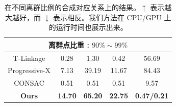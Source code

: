 \begin{table}[ht]
{\begin{tabular}{ccccc}
            \hline
            \multicolumn{5}{c}{离群点比重 : $90\%\sim99\%$} \\
            \hline
            T-Linkage & 0.28 & 1.30 & 0.42 & 56.69 \\
            Progressive-X & 7.13 & 39.19 & 11.67 & 84.43\\
            CONSAC & 0.51 & 0.51 & 0.51 & 9.57  \\
            \textbf{Ours} & \textbf{14.70} & \textbf{65.20} & \textbf{22.75} & \textbf{0.47/0.21} \\ %
            \bottomrule
    
        \end{tabular}
        }
        \caption{在不同离群比例的合成对应关系上的结果。$\uparrow$ 表示越大越好，而 $\downarrow$ 表示相反。我们方法在 CPU/GPU 上的运行时间也展示出来。}
        \label{tab:mm}
\end{table}

